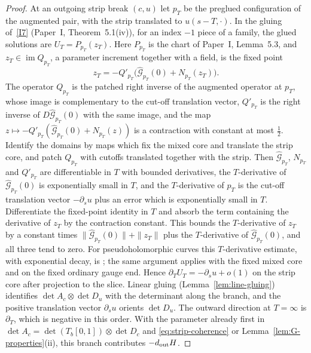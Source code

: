 \documentclass[11pt]{amsart}
\theoremstyle{definition}
\theoremstyle{remark}
\theoremstyle{plain}
\numberwithin{equation}{section}
\newcommand{\im}{\operatorname{im}}
\begin{document}
\begin{proof}
At an outgoing strip break $(c,u)$ let $p_T$ be the preglued
configuration of the augmented pair, with the strip translated to
$u(s-T,\cdot)$. In the gluing of~\ref{I7} (Paper~I, Theorem~5.1(iv)), for an index
$-1$ piece of a family, the glued solutions are $U_T=P_{p_T}(z_T)$.
Here $P_{p_T}$ is the chart of Paper~I, Lemma~5.3, and
$z_T\in\im Q_{p_T}$, a parameter increment together with a field, is the
fixed point
\[
 z_T=-Q'_{p_T}\bigl(\widehat{\mathcal G}_{p_T}(0)+N_{p_T}(z_T)\bigr).
\]
The operator $Q_{p_T}$ is the patched right inverse of the augmented operator at
$p_T$, whose image is complementary to the cut-off translation vector,
$Q'_{p_T}$ is the right inverse of $D\widehat{\mathcal G}_{p_T}(0)$ with
the same image, and the map
$z\mapsto-Q'_{p_T}(\widehat{\mathcal G}_{p_T}(0)+N_{p_T}(z))$ is a
contraction with constant at most $\frac12$. Identify the domains by maps
which fix the mixed core and translate the strip core, and patch
$Q_{p_T}$ with cutoffs translated together with the strip. Then
$\widehat{\mathcal G}_{p_T}$, $N_{p_T}$ and $Q'_{p_T}$ are differentiable
in $T$ with bounded derivatives, the $T$-derivative of
$\widehat{\mathcal G}_{p_T}(0)$ is exponentially small in $T$, and the
$T$-derivative of $p_T$ is the cut-off translation vector $-\partial_su$
plus an error which is exponentially small in $T$. Differentiate the
fixed-point identity in $T$ and absorb the term containing the
derivative of $z_T$ by the contraction constant. This bounds the
$T$-derivative of $z_T$ by a constant times
$\|\widehat{\mathcal G}_{p_T}(0)\|+\|z_T\|$ plus the $T$-derivative of
$\widehat{\mathcal G}_{p_T}(0)$, and all three tend to zero. For
pseudoholomorphic curves this $T$-derivative estimate, with exponential
decay, is \cite[Theorem~6.4]{FOOO-decay}; the same argument applies with
the fixed mixed core and on the fixed ordinary gauge end.
Hence $\partial_TU_T=-\partial_su+o(1)$ on the strip core after
projection to the slice. Linear gluing (Lemma~\ref{lem:line-gluing})
identifies $\det A_c\otimes\det D_u$ with the determinant along the
branch, and the positive translation vector $\partial_su$ orients
$\det D_u$. The outward direction at $T=\infty$ is $\partial_T$, which
is negative in this order. With the parameter already first in
$\det A_c=\det(T_b[0,1])\otimes\det D_c$ and
\eqref{eq:strip-coherence} or Lemma~\ref{lem:G-properties}(ii), this
branch contributes $-d_{\rm out}H$.


\end{proof}
\end{document}

